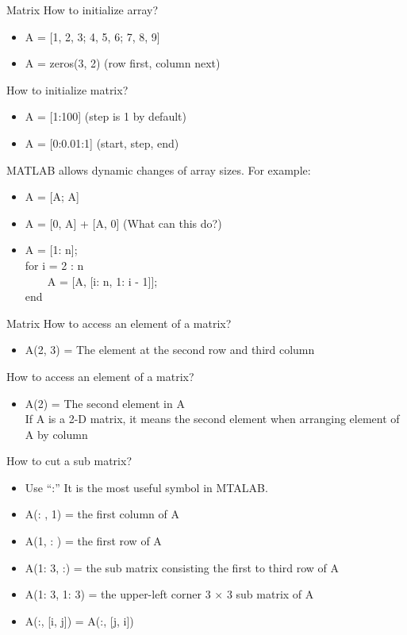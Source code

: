 \begin{frame}{Matrix}
How to initialize array?
\begin{itemize}
\item A = [1, 2, 3; 4, 5, 6; 7, 8, 9]
\item A = zeros(3, 2) (row first, column next)
\end{itemize}
How to initialize matrix?
\begin{itemize}
\item A = [1:100] (step is 1 by default)
\item A = [0:0.01:1] (start, step, end)
\end{itemize}
MATLAB allows dynamic changes of array sizes. For example:
\begin{itemize}
\item A = [A; A]
\item A = [0, A] + [A, 0] (What can this do?)
\item A = [1: n];\\
	for i = 2 : n\\
	\ \ \ \ A = [A, [i: n, 1: i - 1]];\\
	end
\end{itemize}
\end{frame}

\begin{frame}{Matrix}
How to access an element of a matrix?
\begin{itemize}
\item A(2, 3) = The element at the second row and third column
\end{itemize}
How to access an element of a matrix?
\begin{itemize}
\item A(2) = The second element in A\\
\* If A is a 2-D matrix, it means the second element when arranging element of A by column
\end{itemize}
How to cut a sub matrix?
\begin{itemize}
\item Use ``:''  It is the most useful symbol in MTALAB.
\item A(: , 1) = the first column of A
\item A(1, : ) = the first row of A
\item A(1: 3, :) = the sub matrix consisting the first to third row of A
\item A(1: 3, 1: 3) = the upper-left corner 3 $\times$ 3 sub matrix of A
\item A(:, [i, j]) = A(:, [j, i])
\end{itemize}
\end{frame}

